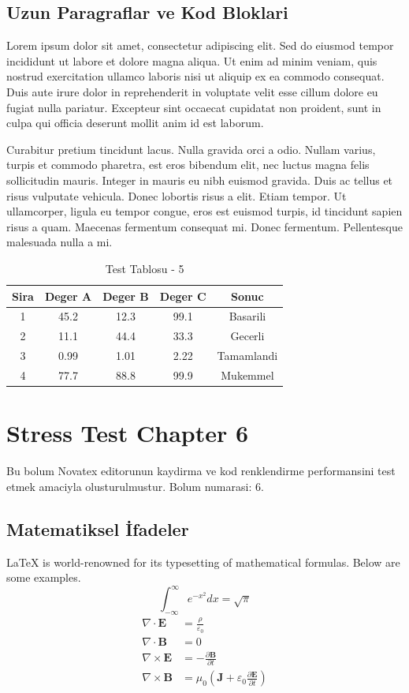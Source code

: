 \documentclass[12pt,a4paper]{article}
\begin{document}
\subsection{Uzun Paragraflar ve Kod Bloklari}
Lorem ipsum dolor sit amet, consectetur adipiscing elit. Sed do eiusmod tempor incididunt ut labore et dolore magna aliqua. Ut enim ad minim veniam, quis nostrud exercitation ullamco laboris nisi ut aliquip ex ea commodo consequat. Duis aute irure dolor in reprehenderit in voluptate velit esse cillum dolore eu fugiat nulla pariatur. Excepteur sint occaecat cupidatat non proident, sunt in culpa qui officia deserunt mollit anim id est laborum.

Curabitur pretium tincidunt lacus. Nulla gravida orci a odio. Nullam varius, turpis et commodo pharetra, est eros bibendum elit, nec luctus magna felis sollicitudin mauris. Integer in mauris eu nibh euismod gravida. Duis ac tellus et risus vulputate vehicula. Donec lobortis risus a elit. Etiam tempor. Ut ullamcorper, ligula eu tempor congue, eros est euismod turpis, id tincidunt sapien risus a quam. Maecenas fermentum consequat mi. Donec fermentum. Pellentesque malesuada nulla a mi.

\begin{table}[h!]
\centering
\begin{tabular}{|c|c|c|c|c|}
\hline
\textbf{Sira} & \textbf{Deger A} & \textbf{Deger B} & \textbf{Deger C} & \textbf{Sonuc} \\
\hline
1 & 45.2 & 12.3 & 99.1 & Basarili \\
2 & 11.1 & 44.4 & 33.3 & Gecerli \\
3 & 0.99 & 1.01 & 2.22 & Tamamlandi \\
4 & 77.7 & 88.8 & 99.9 & Mukemmel \\
\hline
\end{tabular}
\caption{Test Tablosu - 5}
\end{table}

\newpage
\section{Stress Test Chapter 6}
Bu bolum Novatex editorunun kaydirma ve kod renklendirme performansini test etmek amaciyla olusturulmustur. Bolum numarasi: 6.

\subsection{Matematiksel İfadeler}
\LaTeX{} is world-renowned for its typesetting of mathematical formulas. Below are some examples.
\begin{equation}
\int_{-\infty}^{\infty} e^{-x^2} dx = \sqrt{\pi}
\end{equation}
\begin{align}
\nabla \cdot \mathbf{E} &= \frac{\rho}{\varepsilon_0} \\
\nabla \cdot \mathbf{B} &= 0 \\
\nabla \times \mathbf{E} &= -\frac{\partial \mathbf{B}}{\partial t} \\
\nabla \times \mathbf{B} &= \mu_0\left(\mathbf{J} + \varepsilon_0 \frac{\partial \mathbf{E}}{\partial t}\right)
\end{align}
\end{document}
